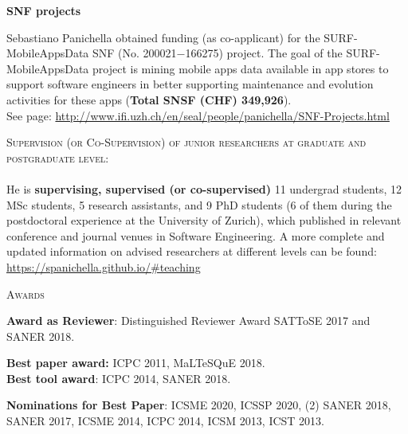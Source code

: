 \documentclass[12pt]{article}
\newcommand{\ra}{$\rightarrow$}
\newcommand{\chg}[2]{\textcolor{red}{\sout{#1}}{\ra}\textcolor{blue}{\uline{#2}}} %
\newcommand{\chg}[2]{#2}
\begin{document}
\textbf{SNF projects}
\begin{innerlist}
   \item Sebastiano Panichella obtained funding  (as co-applicant) for
   the SURF-MobileAppsData SNF (No. 200021$-$166275) project. The goal of the SURF-MobileAppsData project is mining mobile apps data available in app stores to support software engineers in better supporting maintenance and evolution activities for these apps (\textbf{Total SNSF (CHF) 349,926}). \\See page: \href{http://www.ifi.uzh.ch/en/seal/people/panichella/SNF-Projects.html}{http://www.ifi.uzh.ch/en/seal/people/panichella/SNF-Projects.html}
\end{innerlist}

\vspace{6.5mm}


\textsc{Supervision (or Co-Supervision) of junior researchers at graduate and postgraduate level:}\\\\
He is \textbf{supervising, supervised (or co-supervised)} 11 undergrad students, 12 MSc students, 5 research assistants, and 9 PhD students (6 of them during the postdoctoral experience at the University of Zurich), which published in relevant conference and journal venues in Software Engineering. A more complete and updated information on advised researchers at different levels can be found: \href{https://spanichella.github.io/\#teaching}{https://spanichella.github.io/\#teaching}\\
\vspace{1.5mm}

\vspace{2.5mm}

\textsc{Awards}
\vspace{3.5mm}

\textbf{Award as Reviewer}: Distinguished Reviewer Award SATToSE 2017 and SANER 2018.


\textbf{Best paper award:} ICPC 2011, MaLTeSQuE 2018.\\ 
\textbf{Best tool award}: ICPC 2014, SANER 2018. 

\vspace{1.5mm}

\textbf{Nominations for Best Paper}: ICSME 2020, ICSSP 2020, (2) SANER 2018, SANER 2017, ICSME 2014, ICPC 2014, ICSM 2013, ICST 2013.
\end{document}
